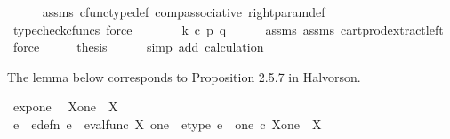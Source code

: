 \begin{isabellebody}
\ \ \ \ \isamarkupfalse%
\ assms\ cfunc{\isacharunderscore}{\kern0pt}type{\isacharunderscore}{\kern0pt}def\ comp{\isacharunderscore}{\kern0pt}associative\ right{\isacharunderscore}{\kern0pt}param{\isacharunderscore}{\kern0pt}def{}\ \isamarkupfalse%
\ {\isacharparenleft}{\kern0pt}typecheck{\isacharunderscore}{\kern0pt}cfuncs{\isacharcomma}{\kern0pt}\ force{\isacharparenright}{\kern0pt}\isanewline
\ \ \isamarkupfalse%
\ \isamarkupfalse%
\ {\isachardoublequoteopen}{\isachardot}{\kern0pt}{\isachardot}{\kern0pt}{\isachardot}{\kern0pt}\ {\isacharequal}{\kern0pt}\ k\ {\isasymcirc}\isactrlsub c\ {\isasymlangle}p{\isacharcomma}{\kern0pt}\ q{\isasymrangle}{\isachardoublequoteclose}\isanewline
\ \ \ \ \isamarkupfalse%
\ assms{\isacharparenleft}{\kern0pt}{}{\isacharparenright}{\kern0pt}\ assms{\isacharparenleft}{\kern0pt}{}{\isacharparenright}{\kern0pt}\ cart{\isacharunderscore}{\kern0pt}prod{\isacharunderscore}{\kern0pt}extract{\isacharunderscore}{\kern0pt}left\ \isamarkupfalse%
\ force\isanewline
\ \ \isamarkupfalse%
\ \isamarkupfalse%
\ {\isacharquery}{\kern0pt}thesis\isanewline
\ \ \ \ \isamarkupfalse%
\ {\isacharparenleft}{\kern0pt}simp\ add{\isacharcolon}{\kern0pt}\ calculation{\isacharparenright}{\kern0pt}\isanewline
{}\isamarkupfalse%
%
\endisatagproof
{\isafoldproof}%
%
\isadelimproof
%
\endisadelimproof
%
\isadelimdocument
%
\endisadelimdocument
%
\isatagdocument
%
\isamarkuptrue%
%
\endisatagdocument
{\isafolddocument}%
%
\isadelimdocument
%
\endisadelimdocument
%
\begin{isamarkuptext}%
The lemma below corresponds to Proposition 2.5.7 in Halvorson.%
\end{isamarkuptext}\isamarkuptrue%
\isamarkupfalse%
\ exp{\isacharunderscore}{\kern0pt}one{\isacharcolon}{\kern0pt}\isanewline
\ \ {\isachardoublequoteopen}X\isactrlbsup one\isactrlesup \ {\isasymcong}\ X{\isachardoublequoteclose}\isanewline
%
\isadelimproof
%
\endisadelimproof
%
\isatagproof
{}\isamarkupfalse%
\ {\isacharminus}{\kern0pt}\isanewline
\ \ \isamarkupfalse%
\ e\ \ e{\isacharunderscore}{\kern0pt}defn{\isacharcolon}{\kern0pt}\ {\isachardoublequoteopen}e\ {\isacharequal}{\kern0pt}\ eval{\isacharunderscore}{\kern0pt}func\ X\ one{\isachardoublequoteclose}\ \ e{\isacharunderscore}{\kern0pt}type{\isacharcolon}{\kern0pt}\ {\isachardoublequoteopen}e\ {\isacharcolon}{\kern0pt}\ one\ {\isasymtimes}\isactrlsub c\ X\isactrlbsup one\isactrlesup \ {\isasymrightarrow}\ X{\isachardoublequoteclose}\isanewline

\end{isabellebody}
